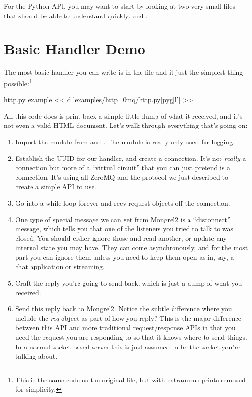 For the Python API, you may want to start by looking at two very small files that should be able to understand quickly:
 and
.


\section{Basic Handler Demo}

The most basic handler you can write is in the  file
and it just the simplest thing possible:\footnote{This is the same code as the original
file, but with extraneous prints removed for simplicity.}

\begin{code}{http.py example}
 << d['examples/http_0mq/http.py|pyg|l'] >>
\end{code}

All this code does is print back a simple little dump of what it received, and
it's not even a valid HTML document.  Let's walk through everything that's going on:

\begin{enumerate}
\item Import the  module from  and .  The  module is
    really only used for logging.
\item Establish the UUID for our handler, and create a connection.  It's not \emph{really} a connection
    but more of a ``virtual circuit'' that you can just pretend is a connection.  It's using all ZeroMQ and
    the protocol we just described to create a simple API to use.
\item Go into a while loop forever and recv request objects off the connection.
\item One type of special message we can get from Mongrel2 is a ``disconnect'' message, which tells you that
    one of the listeners you tried to talk to was closed.  You should either ignore those and read
    another, or update any internal state you may have.  They can come asynchronously, and for the most
    part you can ignore them unless you need to keep them open as in, say, a chat application or streaming.
\item Craft the reply you're going to send back, which is just a dump of what you received.
\item Send this reply back to Mongrel2.  Notice the subtle difference where you include the \emph{req} object
    as part of how you reply?  This is the major difference between this API and more traditional
    request/response APIs in that you need the request you are responding to so that it knows where to send
    things.  In a normal socket-based server this is just assumed to be the socket you're talking about.
\end{enumerate}

